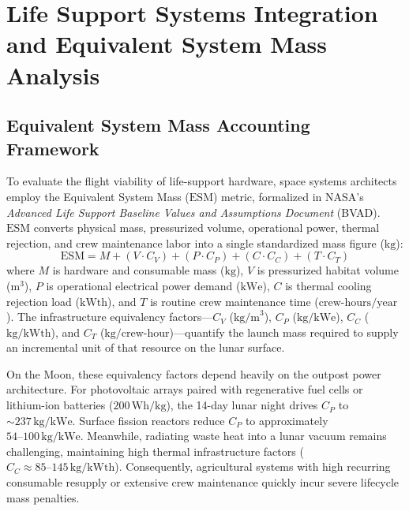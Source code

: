 \section{Life Support Systems Integration and Equivalent System Mass Analysis}
\label{sec:esm_analysis}

\subsection{Equivalent System Mass Accounting Framework}
\label{subsec:esm_framework}

To evaluate the flight viability of life-support hardware, space systems architects employ the Equivalent System Mass ($\mathrm{ESM}$) metric, formalized in NASA's \textit{Advanced Life Support Baseline Values and Assumptions Document} (BVAD)\cite{hanford2004advanced,hanford2006baseline}. $\mathrm{ESM}$ converts physical mass, pressurized volume, operational power, thermal rejection, and crew maintenance labor into a single standardized mass figure ($\mathrm{kg}$)\cite{hanford2004advanced,ho2022towards}:
\begin{equation}
    \mathrm{ESM} = M + \left(V \cdot C_V\right) + \left(P \cdot C_P\right) + \left(C \cdot C_C\right) + \left(T \cdot C_T\right)
    \label{eq:esm_formulation}
\end{equation}
where $M$ is hardware and consumable mass ($\mathrm{kg}$), $V$ is pressurized habitat volume ($\mathrm{m}^3$), $P$ is operational electrical power demand ($\mathrm{kWe}$), $C$ is thermal cooling rejection load ($\mathrm{kWth}$), and $T$ is routine crew maintenance time ($\mathrm{crew\text{-}hours/year}$)\cite{hanford2004advanced,hanford2006baseline}. The infrastructure equivalency factors---$C_V$ ($\mathrm{kg/m}^3$), $C_P$ ($\mathrm{kg/kWe}$), $C_C$ ($\mathrm{kg/kWth}$), and $C_T$ ($\mathrm{kg/crew\text{-}hour}$)---quantify the launch mass required to supply an incremental unit of that resource on the lunar surface\cite{hanford2004advanced,ho2022towards}.

On the Moon, these equivalency factors depend heavily on the outpost power architecture\cite{anderson2021lunar,vos2020internal}. For photovoltaic arrays paired with regenerative fuel cells or lithium-ion batteries ($200\,\mathrm{Wh/kg}$), the 14-day lunar night drives $C_P$ to $\sim 237\,\mathrm{kg/kWe}$\cite{vos2020internal,colozza2020power}. Surface fission reactors reduce $C_P$ to approximately $54\text{--}100\,\mathrm{kg/kWe}$\cite{colozza2020power}. Meanwhile, radiating waste heat into a lunar vacuum remains challenging, maintaining high thermal infrastructure factors ($C_C \approx 85\text{--}145\,\mathrm{kg/kWth}$)\cite{vos2020internal,ewert2022bvad}. Consequently, agricultural systems with high recurring consumable resupply or extensive crew maintenance quickly incur severe lifecycle mass penalties\cite{ming1989lunar,hanford2004advanced,ewert2022bvad}.

